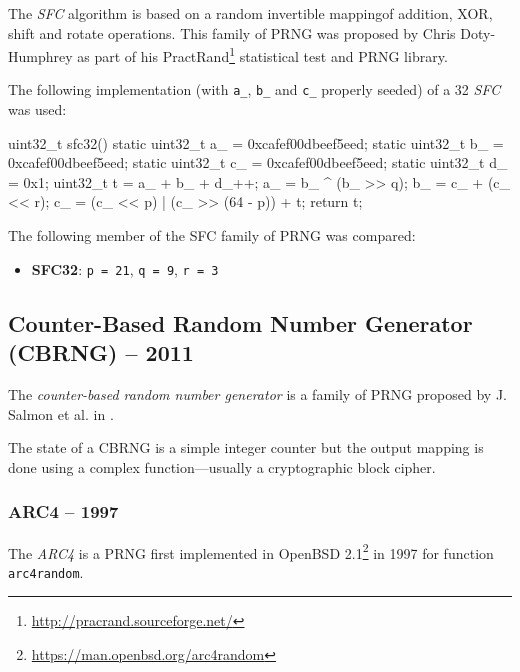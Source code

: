     The \emph{SFC} algorithm is based on a random invertible mapping\footnotemark[5] of addition, XOR, shift and rotate operations. This family of PRNG was proposed by Chris Doty-Humphrey as part of his PractRand\footnote[8]{\url{http://pracrand.sourceforge.net/}} statistical test and PRNG library.

    The following implementation (with \lstinline|a_|, \lstinline|b_| and \lstinline|c_| properly seeded) of a \SI{32}{\bit} \emph{SFC} was used:
\begin{@empty}
    \lstset{
        language = [ISO]C++
    }
\begin{centeredshadowboxlisting}
uint32_t sfc32() {
    static uint32_t a_ = 0xcafef00dbeef5eed;
    static uint32_t b_ = 0xcafef00dbeef5eed;
    static uint32_t c_ = 0xcafef00dbeef5eed;
    static uint32_t d_ = 0x1;
    uint32_t t = a_ + b_ + d_++;
    a_ = b_ ^ (b_ >> q);
    b_ = c_ + (c_ << r);
    c_ = (c_ << p) | (c_ >> (64 - p)) + t;
    return t;
}
\end{centeredshadowboxlisting}
\end{@empty}

    The following member of the SFC family of PRNG was compared:
    \begin{itemize}
        \itemsep0em
        \item \textbf{SFC32}: \lstinline|p = 21|, \lstinline|q = 9|, \lstinline|r = 3|
    \end{itemize}

\subsection[Counter-Based Random Number Generator (CBRNG) -- 2011]{Counter-Based Random Number Generator (CBRNG) -- 2011} \label{subsec:cbrng}

    The \emph{counter-based random number generator} is a family of PRNG proposed by J. Salmon et al. in \cite{Salmon:2011}.

    The state of a CBRNG is a simple integer counter but the output mapping is done using a complex function---usually a cryptographic block cipher.

\subsubsection[ARC4 -- 1997]{ARC4 -- 1997} \label{subsubsec:arc4}

    The \emph{ARC4} is a PRNG first implemented in OpenBSD 2.1\footnote[9]{\url{https://man.openbsd.org/arc4random}} in 1997 for function \lstinline|arc4random|.


